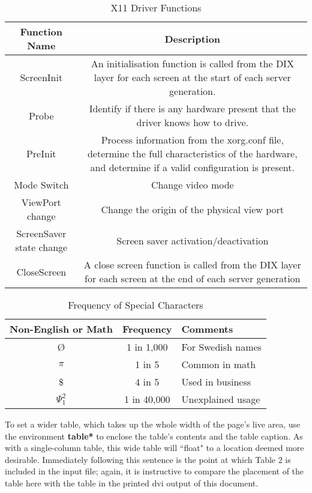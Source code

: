 \documentclass{acm_proc_article-sp}
\begin{document}
\begin{table}
 \centering
  \caption{X11 Driver Functions}
  \begin{tabular}{|c|c|} \hline
  Function Name&Description\\ \hline
  ScreenInit & An initialisation function is called from the DIX layer for each screen at the start of each server generation.\\ \hline
  Probe & Identify if there is any hardware present that the driver knows how to drive.\\ \hline
  PreInit & Process information from the xorg.conf file, determine the full characteristics of the hardware, and determine if a valid configuration is present. \\ \hline
  Mode Switch & Change video mode \\ \hline
  ViewPort change & Change the origin of the physical view port \\ \hline
  ScreenSaver state change & Screen saver activation/deactivation \\ \hline
  CloseScreen & A close screen function is called from the DIX layer for each screen at the end of each server generation \\ \hline
\hline\end{tabular}
\end{table}

\begin{table}
\centering
\caption{Frequency of Special Characters}
\begin{tabular}{|c|c|l|} \hline
Non-English or Math&Frequency&Comments\\ \hline
\O & 1 in 1,000& For Swedish names\\ \hline
$\pi$ & 1 in 5& Common in math\\ \hline
\$ & 4 in 5 & Used in business\\ \hline
$\Psi^2_1$ & 1 in 40,000& Unexplained usage\\
\hline\end{tabular}
\end{table}

To set a wider table, which takes up the whole width of
the page's live area, use the environment
\textbf{table*} to enclose the table's contents and
the table caption.  As with a single-column table, this wide
table will ``float" to a location deemed more desirable.
Immediately following this sentence is the point at which
Table 2 is included in the input file; again, it is
instructive to compare the placement of the
table here with the table in the printed dvi
output of this document.
\end{document}

